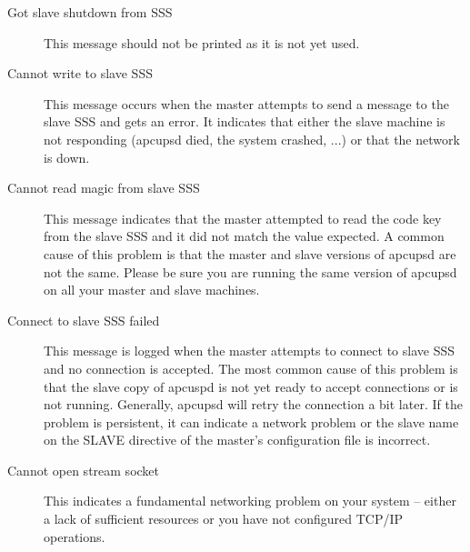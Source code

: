 {{{{{{\begin{description}
\item[Got slave shutdown from SSS]
   \label{Got-slave-shutdown-from-SSS}
This message should not be printed as it is not yet used. 

\item[Cannot write to slave SSS]
   \label{Cannot-write-to-slave-SSS}
This message occurs when the master attempts to send a message to the slave
SSS and gets an error. It indicates that either the slave machine is not
responding (apcupsd died, the system crashed, ...) or that the network is
down. 

\item[Cannot read magic from slave SSS]
   \label{Cannot-read-magic-from-slave-SSS}
This message indicates that the master attempted to read the code key from the
slave SSS and it did not match the value expected. A common cause of this
problem is that the master and slave versions of apcupsd are not the same.
Please be sure you are running the same version of apcupsd on all your master
and slave machines. 

\item[Connect to slave SSS failed]
   \label{Connect-to-slave-SSS-failed}
This message is logged when the master attempts to connect to slave SSS and no
connection is accepted. The most common cause of this problem is that the
slave copy of apcuspd is not yet ready to accept connections or is not
running. Generally, apcupsd will retry the connection a bit later. If the
problem is persistent, it can indicate a network problem or the slave name on
the SLAVE directive of the master's configuration file is incorrect. 

\item[Cannot open stream socket]
   \label{Cannot-open-stream-socket}
This indicates a fundamental networking problem on your system {--} either a
lack of sufficient resources or you have not configured TCP/IP operations. 
\end{description}

}}}}}}
